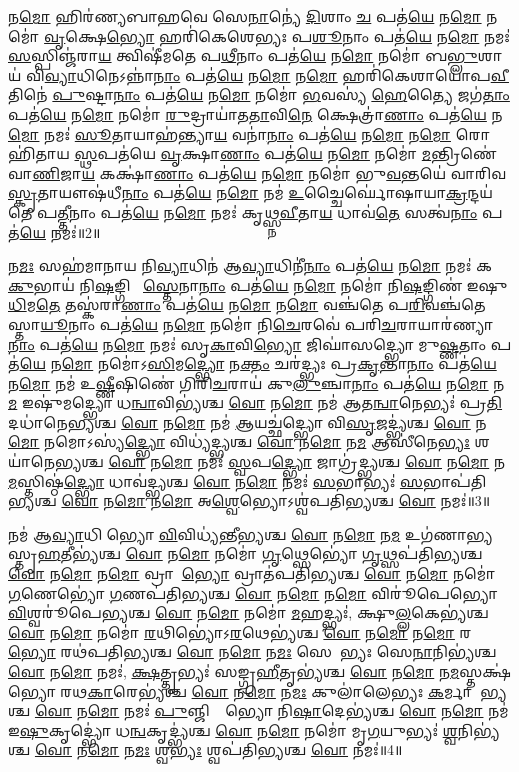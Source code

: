 𑌨\ul{𑌮𑍋} 𑌹𑌿𑌰॑𑌣𑍍𑌯𑌬𑌾𑌹𑌵𑍇 𑌸𑍇\ul{𑌨𑌾}𑌨𑍍𑌯𑍇॑ \ul{𑌦𑌿}𑌶𑌾𑌂 \ul{𑌚} 𑌪𑌤॑\ul{𑌯𑍇} 𑌨\ul{𑌮𑍋} 𑌨𑌮𑍋॑ \ul{𑌵𑍃}𑌕𑍍𑌷𑍇\ul{𑌭𑍍𑌯𑍋} 𑌹𑌰𑌿॑𑌕𑍇𑌶𑍇𑌭𑍍𑌯𑌃 𑌪\ul{𑌶𑍂}𑌨𑌾𑌂 𑌪𑌤॑\ul{𑌯𑍇} 𑌨\ul{𑌮𑍋} 𑌨𑌮𑌃॑ \ul{𑌸}𑌸𑍍𑌪𑌿𑌞𑍍𑌜॑𑌰𑌾\ul{𑌯} 𑌤𑍍𑌵𑌿𑌷𑍀॑𑌮𑌤𑍇 𑌪\ul{𑌥𑍀}𑌨𑌾𑌂 𑌪𑌤॑\ul{𑌯𑍇} 𑌨\ul{𑌮𑍋} 𑌨𑌮𑍋॑ 𑌬\ul{𑌭𑍍𑌲𑍁}𑌶𑌾𑌯॑ 𑌵𑌿\ul{𑌵𑍍𑌯𑌾}𑌧𑌿𑌨𑍇\-𑌽𑌨𑍍𑌨𑌾॑\ul{𑌨𑌾𑌂} 𑌪𑌤॑\ul{𑌯𑍇} 𑌨\ul{𑌮𑍋} 𑌨\ul{𑌮𑍋} 𑌹𑌰𑌿॑𑌕𑍇𑌶𑌾𑌯𑍋𑌪\ul{𑌵𑍀}𑌤𑌿𑌨𑍇॑ \ul{𑌪𑍁}𑌷𑍍𑌟𑌾\ul{𑌨𑌾𑌂} 𑌪𑌤॑\ul{𑌯𑍇} 𑌨\ul{𑌮𑍋} 𑌨𑌮𑍋॑ \ul{𑌭}𑌵𑌸𑍍𑌯॑ \ul{𑌹𑍇}𑌤𑍍𑌯𑍈 𑌜𑌗॑\ul{𑌤𑌾𑌂} 𑌪𑌤॑\ul{𑌯𑍇} 𑌨\ul{𑌮𑍋} 𑌨𑌮𑍋॑ \ul{𑌰𑍁}𑌦𑍍𑌰𑌾𑌯𑌾॑𑌤\ul{𑌤𑌾}𑌵𑌿\ul{𑌨𑍇} 𑌕𑍍𑌷𑍇𑌤𑍍𑌰𑌾॑\ul{𑌣𑌾𑌂} 𑌪𑌤॑\ul{𑌯𑍇} 𑌨\ul{𑌮𑍋} 𑌨𑌮𑌃॑ \ul{𑌸𑍂}𑌤𑌾𑌯𑌾𑌹॑𑌨𑍍𑌤𑍍𑌯𑌾\ul{𑌯} 𑌵𑌨𑌾॑\ul{𑌨𑌾𑌂} 𑌪𑌤॑\ul{𑌯𑍇} 𑌨\ul{𑌮𑍋} 𑌨\ul{𑌮𑍋} 𑌰𑍋𑌹𑌿॑𑌤𑌾𑌯 \ul{𑌸𑍍𑌥}𑌪𑌤॑𑌯𑍇 \ul{𑌵𑍃}𑌕𑍍𑌷𑌾\ul{𑌣𑌾𑌂} 𑌪𑌤॑\ul{𑌯𑍇} 𑌨\ul{𑌮𑍋} 𑌨𑌮𑍋॑ \ul{𑌮}𑌨𑍍𑌤𑍍𑌰𑌿𑌣𑍇॑ 𑌵𑌾\ul{𑌣𑌿}𑌜𑌾\ul{𑌯} 𑌕𑌕𑍍𑌷𑌾॑\ul{𑌣𑌾𑌂} 𑌪𑌤॑\ul{𑌯𑍇} 𑌨\ul{𑌮𑍋} 𑌨𑌮𑍋॑ 𑌭𑍁\ul{𑌵}𑌨𑍍𑌤𑌯𑍇॑ 𑌵𑌾𑌰𑌿𑌵\ul{𑌸𑍍𑌕𑍃}𑌤𑌾𑌯𑍗𑌷॑𑌧𑍀\ul{𑌨𑌾𑌂} 𑌪𑌤॑\ul{𑌯𑍇} 𑌨\ul{𑌮𑍋} 𑌨𑌮॑ \ul{𑌉}𑌚𑍍𑌚𑍈𑌰𑍍𑌘𑍋॑𑌷𑌾\-𑌯𑌾\ul{𑌕𑍍𑌰}𑌨𑍍𑌦𑌯॑𑌤𑍇 𑌪\ul{𑌤𑍍𑌤𑍀}𑌨𑌾𑌂 𑌪𑌤॑\ul{𑌯𑍇} 𑌨\ul{𑌮𑍋} 𑌨𑌮𑌃॑ 𑌕𑍃𑌥𑍍𑌸𑍍𑌨\ul{𑌵𑍀}𑌤𑌾\ul{𑌯} 𑌧𑌾𑌵॑\ul{𑌤𑍇} 𑌸𑌤𑍍𑌵॑\ul{𑌨𑌾𑌂} 𑌪𑌤॑\ul{𑌯𑍇} 𑌨𑌮𑌃॑॥2॥ 


𑌨\ul{𑌮𑌃} 𑌸𑌹॑𑌮𑌾𑌨𑌾𑌯 𑌨𑌿\ul{𑌵𑍍𑌯𑌾}𑌧𑌿𑌨॑ 𑌆\ul{𑌵𑍍𑌯𑌾}𑌧𑌿𑌨𑍀॑\ul{𑌨𑌾𑌂} 𑌪𑌤॑\ul{𑌯𑍇} 𑌨\ul{𑌮𑍋} 𑌨𑌮𑌃॑ 𑌕\ul{𑌕𑍁}𑌭𑌾𑌯॑ 𑌨𑌿\ul{𑌷}𑌙𑍍𑌗𑌿𑌣𑍇᳚ \ul{𑌸𑍍𑌤𑍇}𑌨𑌾\ul{𑌨𑌾𑌂} 𑌪𑌤॑\ul{𑌯𑍇} 𑌨\ul{𑌮𑍋} 𑌨𑌮𑍋॑ 𑌨𑌿\ul{𑌷}𑌙𑍍𑌗𑌿𑌣॑ 𑌇𑌷𑍁\ul{𑌧𑌿}𑌮\ul{𑌤𑍇} 𑌤𑌸𑍍𑌕॑𑌰𑌾\ul{𑌣𑌾𑌂} 𑌪𑌤॑\ul{𑌯𑍇} 𑌨\ul{𑌮𑍋} 𑌨\ul{𑌮𑍋} 𑌵𑌞𑍍𑌚॑𑌤𑍇 𑌪\ul{𑌰𑌿}𑌵𑌞𑍍𑌚॑𑌤𑍇 𑌸𑍍𑌤𑌾\ul{𑌯𑍂}𑌨𑌾𑌂 𑌪𑌤॑\ul{𑌯𑍇} 𑌨\ul{𑌮𑍋} 𑌨𑌮𑍋॑ 𑌨𑌿\ul{𑌚𑍇}𑌰𑌵𑍇॑ 𑌪𑌰𑌿\ul{𑌚}𑌰𑌾𑌯𑌾𑌰॑𑌣𑍍𑌯𑌾\ul{𑌨𑌾𑌂} 𑌪𑌤॑\ul{𑌯𑍇} 𑌨\ul{𑌮𑍋} 𑌨𑌮𑌃॑ 𑌸𑍃\ul{𑌕𑌾}𑌵𑌿\ul{𑌭𑍍𑌯𑍋} 𑌜𑌿𑌘𑌾॑𑌸𑌦𑍍𑌭𑍍𑌯𑍋 𑌮𑍁\ul{𑌷𑍍𑌣}𑌤𑌾𑌂 𑌪𑌤॑\ul{𑌯𑍇} 𑌨\ul{𑌮𑍋} 𑌨𑌮𑍋॑𑌽\ul{𑌸𑌿}𑌮\ul{𑌦𑍍𑌭𑍍𑌯𑍋} 𑌨\ul{𑌕𑍍𑌤𑌂} 𑌚𑌰॑𑌦𑍍𑌭𑍍𑌯𑌃 𑌪𑍍𑌰\ul{𑌕𑍃}𑌨𑍍𑌤𑌾\ul{𑌨𑌾𑌂} 𑌪𑌤॑\ul{𑌯𑍇} 𑌨\ul{𑌮𑍋} 𑌨𑌮॑ 𑌉\ul{𑌷𑍍𑌣𑍀}𑌷𑌿𑌣𑍇॑ 𑌗𑌿𑌰𑌿\ul{𑌚}𑌰𑌾𑌯॑ 𑌕𑍁\ul{𑌲𑍁}𑌞𑍍𑌚𑌾\ul{𑌨𑌾𑌂} 𑌪𑌤॑\ul{𑌯𑍇} 𑌨\ul{𑌮𑍋} 𑌨\ul{𑌮} 𑌇𑌷𑍁॑𑌮𑌦𑍍𑌭𑍍𑌯𑍋 𑌧\ul{𑌨𑍍𑌵𑌾}𑌵𑌿𑌭𑍍𑌯॑𑌶𑍍𑌚 \ul{𑌵𑍋} 𑌨\ul{𑌮𑍋} 𑌨𑌮॑ 𑌆𑌤\ul{𑌨𑍍𑌵𑌾}𑌨𑍇𑌭𑍍𑌯𑌃॑ 𑌪𑍍𑌰\ul{𑌤𑌿}𑌦𑌧𑌾॑𑌨𑍇𑌭𑍍𑌯𑌶𑍍𑌚 \ul{𑌵𑍋} 𑌨\ul{𑌮𑍋} 𑌨𑌮॑ \ul{𑌆}𑌯𑌚𑍍𑌛॑𑌦𑍍𑌭𑍍𑌯𑍋 𑌵𑌿\ul{𑌸𑍃}𑌜𑌦𑍍𑌭𑍍𑌯॑𑌶𑍍𑌚 \ul{𑌵𑍋} 𑌨\ul{𑌮𑍋} 𑌨𑌮𑍋𑌽𑌸𑍍𑌯॑\ul{𑌦𑍍𑌭𑍍𑌯𑍋} 𑌵𑌿𑌧𑍍𑌯॑𑌦𑍍𑌭𑍍𑌯𑌶𑍍𑌚 \ul{𑌵𑍋} 𑌨\ul{𑌮𑍋} 𑌨\ul{𑌮} 𑌆𑌸𑍀॑𑌨𑍇\ul{𑌭𑍍𑌯𑌃} 𑌶𑌯𑌾॑𑌨𑍇𑌭𑍍𑌯𑌶𑍍𑌚 \ul{𑌵𑍋} 𑌨\ul{𑌮𑍋} 𑌨𑌮𑌃॑ \ul{𑌸𑍍𑌵}𑌪\ul{𑌦𑍍𑌭𑍍𑌯𑍋} 𑌜𑌾𑌗𑍍𑌰॑𑌦𑍍𑌭𑍍𑌯𑌶𑍍𑌚 \ul{𑌵𑍋} 𑌨\ul{𑌮𑍋} 𑌨\ul{𑌮}𑌸𑍍𑌤𑌿𑌷𑍍𑌠॑\ul{𑌦𑍍𑌭𑍍𑌯𑍋} 𑌧𑌾𑌵॑𑌦𑍍𑌭𑍍𑌯𑌶𑍍𑌚 \ul{𑌵𑍋} 𑌨\ul{𑌮𑍋} 𑌨𑌮𑌃॑ \ul{𑌸}𑌭𑌾𑌭𑍍𑌯𑌃॑ \ul{𑌸}𑌭𑌾𑌪॑𑌤𑌿𑌭𑍍𑌯𑌶𑍍𑌚 \ul{𑌵𑍋} 𑌨\ul{𑌮𑍋} 𑌨\ul{𑌮𑍋} 𑌅\ul{𑌶𑍍𑌵𑍇}𑌭𑍍𑌯𑍋𑌽𑌶𑍍𑌵॑𑌪𑌤𑌿𑌭𑍍𑌯𑌶𑍍𑌚 \ul{𑌵𑍋} 𑌨𑌮𑌃॑॥3॥ 

𑌨𑌮॑ 𑌆\ul{𑌵𑍍𑌯𑌾}𑌧𑌿𑌨𑍀᳚𑌭𑍍𑌯𑍋 \ul{𑌵𑌿}𑌵𑌿𑌧𑍍𑌯॑𑌨𑍍𑌤𑍀𑌭𑍍𑌯𑌶𑍍𑌚 \ul{𑌵𑍋} 𑌨\ul{𑌮𑍋} 𑌨\ul{𑌮} 𑌉𑌗॑𑌣𑌾𑌭𑍍𑌯𑌸𑍍𑌤𑍃\-\ul{𑌹}𑌤𑍀𑌭𑍍𑌯॑𑌶𑍍𑌚 \ul{𑌵𑍋} 𑌨\ul{𑌮𑍋} 𑌨𑌮𑍋॑ \ul{𑌗𑍃}𑌥𑍍𑌸𑍇𑌭𑍍𑌯𑍋॑ \ul{𑌗𑍃}𑌥𑍍𑌸𑌪॑𑌤𑌿𑌭𑍍𑌯𑌶𑍍𑌚 \ul{𑌵𑍋} 𑌨\ul{𑌮𑍋} 𑌨\ul{𑌮𑍋} 𑌵𑍍𑌰𑌾𑌤𑍇᳚\ul{𑌭𑍍𑌯𑍋} 𑌵𑍍𑌰𑌾𑌤॑𑌪𑌤𑌿𑌭𑍍𑌯𑌶𑍍𑌚 \ul{𑌵𑍋} 𑌨\ul{𑌮𑍋} 𑌨𑌮𑍋॑ \ul{𑌗}𑌣𑍇𑌭𑍍𑌯𑍋॑ \ul{𑌗}𑌣𑌪॑𑌤𑌿𑌭𑍍𑌯𑌶𑍍𑌚 \ul{𑌵𑍋} 𑌨\ul{𑌮𑍋} 𑌨\ul{𑌮𑍋} 𑌵𑌿𑌰𑍂॑𑌪𑍇𑌭𑍍𑌯𑍋 \ul{𑌵𑌿}𑌶𑍍𑌵𑌰𑍂॑𑌪𑍇𑌭𑍍𑌯𑌶𑍍𑌚 \ul{𑌵𑍋} 𑌨\ul{𑌮𑍋} 𑌨𑌮𑍋॑ \ul{𑌮}𑌹𑌦𑍍𑌭𑍍𑌯𑌃॑, 𑌕𑍍𑌷𑍁\ul{𑌲𑍍𑌲}𑌕𑍇𑌭𑍍𑌯॑𑌶𑍍𑌚 \ul{𑌵𑍋} 𑌨\ul{𑌮𑍋} 𑌨𑌮𑍋॑ \ul{𑌰}𑌥𑌿𑌭𑍍𑌯𑍋॑𑌽\ul{𑌰}𑌥𑍇𑌭𑍍𑌯॑𑌶𑍍𑌚 \ul{𑌵𑍋} 𑌨\ul{𑌮𑍋} 𑌨\ul{𑌮𑍋} 𑌰𑌥𑍇᳚\ul{𑌭𑍍𑌯𑍋} 𑌰𑌥॑𑌪𑌤𑌿𑌭𑍍𑌯𑌶𑍍𑌚 \ul{𑌵𑍋} 𑌨\ul{𑌮𑍋} 𑌨\ul{𑌮𑌃} 𑌸𑍇𑌨𑌾᳚𑌭𑍍𑌯𑌃 𑌸𑍇\ul{𑌨𑌾}𑌨𑌿𑌭𑍍𑌯॑𑌶𑍍𑌚 \ul{𑌵𑍋} 𑌨\ul{𑌮𑍋} 𑌨𑌮𑌃॑, \ul{𑌕𑍍𑌷}𑌤𑍍𑌤𑍃𑌭𑍍𑌯𑌃॑ 𑌸𑌙𑍍𑌗𑍍𑌰\ul{𑌹𑍀}𑌤𑍃𑌭𑍍𑌯॑𑌶𑍍𑌚 \ul{𑌵𑍋} 𑌨\ul{𑌮𑍋} 𑌨\ul{𑌮}𑌸𑍍𑌤𑌕𑍍𑌷॑𑌭𑍍𑌯𑍋 𑌰𑌥\ul{𑌕𑌾}𑌰𑍇𑌭𑍍𑌯॑𑌶𑍍𑌚 \ul{𑌵𑍋} 𑌨\ul{𑌮𑍋} 𑌨\ul{𑌮𑌃} 𑌕𑍁𑌲𑌾॑𑌲𑍇𑌭𑍍𑌯𑌃 \ul{𑌕}𑌰𑍍𑌮𑌾𑌰𑍇᳚𑌭𑍍𑌯𑌶𑍍𑌚 \ul{𑌵𑍋} 𑌨\ul{𑌮𑍋} 𑌨𑌮𑌃॑ \ul{𑌪𑍁}𑌞𑍍𑌜𑌿𑌷𑍍𑌟𑍇᳚𑌭𑍍𑌯𑍋 𑌨𑌿\ul{𑌷𑌾}𑌦𑍇𑌭𑍍𑌯॑𑌶𑍍𑌚 \ul{𑌵𑍋} 𑌨\ul{𑌮𑍋} 𑌨𑌮॑ 𑌇\ul{𑌷𑍁}𑌕𑍃𑌦𑍍𑌭𑍍𑌯𑍋॑ 𑌧\ul{𑌨𑍍𑌵}𑌕𑍃𑌦𑍍𑌭𑍍𑌯॑𑌶𑍍𑌚 \ul{𑌵𑍋} 𑌨\ul{𑌮𑍋} 𑌨𑌮𑍋॑ 𑌮𑍃\ul{𑌗}𑌯𑍁𑌭𑍍𑌯𑌃॑ \ul{𑌶𑍍𑌵}𑌨𑌿𑌭𑍍𑌯॑𑌶𑍍𑌚 \ul{𑌵𑍋} 𑌨\ul{𑌮𑍋} 𑌨\ul{𑌮𑌃} 𑌶𑍍𑌵\ul{𑌭𑍍𑌯𑌃} 𑌶𑍍𑌵𑌪॑𑌤𑌿𑌭𑍍𑌯𑌶𑍍𑌚 \ul{𑌵𑍋} 𑌨𑌮𑌃॑॥4॥ 

